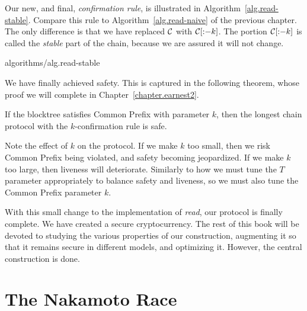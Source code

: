 Our new, and final, \emph{confirmation rule}, is illustrated in
Algorithm~\ref{alg.read-stable}. Compare this rule to Algorithm~\ref{alg.read-naive} of
the previous chapter. The only difference is that we have replaced $\mathcal{C}$ with $\mathcal{C}[{:}{-k}]$.
The portion $\mathcal{C}[{:}{-k}]$ is called the \emph{stable} part of the chain, because we
are assured it will not change.

{algorithms/alg.read-stable}

We have finally achieved safety. This is captured in the following theorem, whose proof we will
complete in Chapter~\ref{chapter.earnest2}.

\begin{theorem}
    If the blocktree satisfies Common Prefix with parameter $k$, then the longest chain protocol
    with the $k$-confirmation rule is safe.
\end{theorem}

Note the effect of $k$ on the protocol. If we make $k$ too small, then we risk Common Prefix
being violated, and safety becoming jeopardized. If we make $k$ too large, then liveness will
deteriorate. Similarly to how we must tune the $T$ parameter appropriately to balance safety
and liveness, so we must also tune the Common Prefix parameter $k$.

With this small change to the implementation of \emph{read}, our protocol is finally complete.
We have created a secure cryptocurrency. The rest of this book will be devoted to studying the
various properties of our construction, augmenting it so that it remains secure in different models,
and optimizing it. However, the central construction is done.

\section{The Nakamoto Race}

